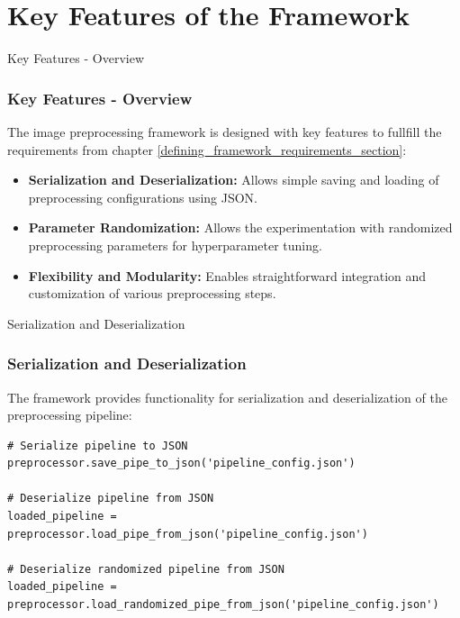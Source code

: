 \section{Key Features of the Framework}
\label{key_features_section}


\begin{frame}{Key Features - Overview}
    \frametitle{Key Features - Overview}
    The image preprocessing framework is designed with key features to fullfill the requirements from chapter \ref{defining_framework_requirements_section}:
    \begin{itemize}
        \item \textbf{Serialization and Deserialization:}  Allows simple saving and loading of preprocessing configurations using JSON.
        \item \textbf{Parameter Randomization:}  Allows the experimentation with randomized preprocessing parameters for hyperparameter tuning.
        \item \textbf{Flexibility and Modularity:} Enables straightforward integration and customization of various preprocessing steps.
    \end{itemize}
\end{frame}

\begin{frame}[fragile]{Serialization and Deserialization}
    \frametitle{Serialization and Deserialization}
    The framework provides functionality for serialization and deserialization of the preprocessing pipeline:

    \begin{lstlisting}[caption={Serialization and Deserialization Example.}, label=lst:serialization]
# Serialize pipeline to JSON
preprocessor.save_pipe_to_json('pipeline_config.json')

# Deserialize pipeline from JSON
loaded_pipeline = preprocessor.load_pipe_from_json('pipeline_config.json')

# Deserialize randomized pipeline from JSON
loaded_pipeline = preprocessor.load_randomized_pipe_from_json('pipeline_config.json')
    \end{lstlisting}
\end{frame}

